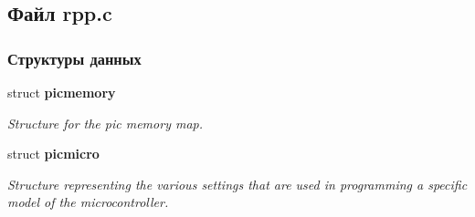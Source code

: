 \subsection{Файл rpp.\+c}
\label{rpp_8c}
\subsubsection*{Структуры данных}
\begin{DoxyCompactItemize}
\item 
struct \textbf{ picmemory}
\begin{DoxyCompactList}\small\item\em Structure for the pic memory map. \end{DoxyCompactList}\item 
struct \textbf{ picmicro}
\begin{DoxyCompactList}\small\item\em Structure representing the various settings that are used in programming a specific model of the microcontroller. \end{DoxyCompactList}\end{DoxyCompactItemize}
